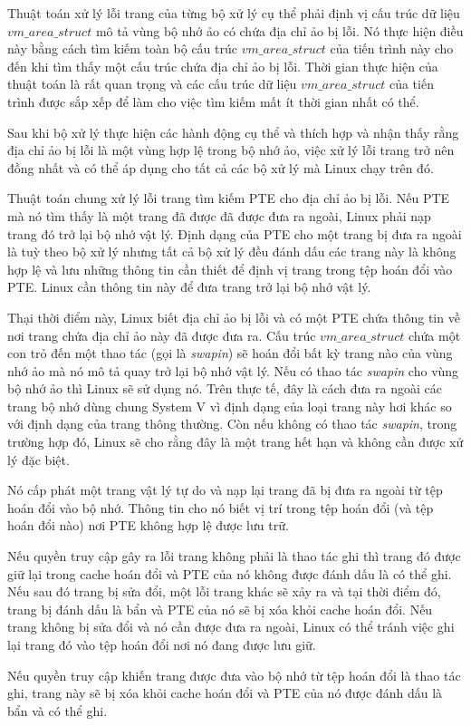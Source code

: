 \documentclass{article}
\begin{document}
Thuật toán xử lý lỗi trang của từng bộ xử lý cụ thể phải định vị cấu trúc dữ liệu $vm\_area\_struct$ mô tả vùng bộ nhớ ảo có chứa địa chỉ ảo bị lỗi. Nó thực hiện điều này bằng cách tìm kiếm toàn bộ cấu trúc $vm\_area\_struct$ của tiến trình này cho đến khi tìm thấy một cấu trúc chứa địa chỉ ảo bị lỗi. Thời gian thực hiện của thuật toán là rất quan trọng và các cấu trúc dữ liệu $vm\_area\_struct$ của tiến trình được sắp xếp để làm cho việc tìm kiếm mất ít thời gian nhất có thể.\vspace{1em}

Sau khi bộ xử lý thực hiện các hành động cụ thể và thích hợp và nhận thấy rằng địa chỉ ảo bị lỗi là một vùng hợp lệ trong bộ nhớ ảo, việc xử lý lỗi trang trở nên đồng nhất và có thể áp dụng cho tất cả các bộ xử lý mà Linux chạy trên đó.\vspace{1em}

Thuật toán chung xử lý lỗi trang tìm kiếm PTE cho địa chỉ ảo bị lỗi. Nếu PTE mà nó tìm thấy là một trang đã được đã được đưa ra ngoài, Linux phải nạp trang đó trở lại bộ nhớ vật lý. Định dạng của PTE cho một trang bị đưa ra ngoài là tuỳ theo bộ xử lý nhưng tất cả bộ xử lý đều đánh dấu các trang này là không hợp lệ và lưu những thông tin cần thiết để định vị trang trong tệp hoán đổi vào PTE. Linux cần thông tin này để đưa trang trở lại bộ nhớ vật lý.\vspace{1em}

Thại thời điểm này, Linux biết địa chỉ ảo bị lỗi và có một PTE chứa thông tin về nơi trang chứa địa chỉ ảo này đã được đưa ra. Cấu trúc $vm\_area\_struct$ chứa một con trỏ đến một thao tác (gọi là \textit{swapin}) sẽ hoán đổi bất kỳ trang nào của vùng nhớ ảo mà nó mô tả quay trở lại bộ nhớ vật lý. Nếu có thao tác \textit{swapin} cho vùng bộ nhớ ảo thì Linux sẽ sử dụng nó. Trên thực tế, đây là cách đưa ra ngoài các trang bộ nhớ dùng chung System V vì định dạng của loại trang này hơi khác so với định dạng của trang thông thường. Còn nếu không có thao tác \textit{swapin}, trong trường hợp đó, Linux sẽ cho rằng đây là một trang hết hạn và không cần được xử lý đặc biệt.\vspace{1em}

Nó cấp phát một trang vật lý tự do và nạp lại trang đã bị đưa ra ngoài từ tệp hoán đổi vào bộ nhớ. Thông tin cho nó biết vị trí trong tệp hoán đổi (và tệp hoán đổi nào) nơi PTE không hợp lệ được lưu trữ.\vspace{1em}

Nếu quyền truy cập gây ra lỗi trang không phải là thao tác ghi thì trang đó được giữ lại trong cache hoán đổi và PTE của nó không được đánh dấu là có thể ghi. Nếu sau đó trang bị sửa đổi, một lỗi trang khác sẽ xảy ra và tại thời điểm đó, trang bị đánh dấu là bẩn và PTE của nó sẽ bị xóa khỏi cache hoán đổi. Nếu trang không bị sửa đổi và nó cần được đưa ra ngoài, Linux có thể tránh việc ghi lại trang đó vào tệp hoán đổi nơi nó đang được lưu giữ.\vspace{1em}

Nếu quyền truy cập khiến trang được đưa vào bộ nhớ từ tệp hoán đổi là thao tác ghi, trang này sẽ bị xóa khỏi cache hoán đổi và PTE của nó được đánh dấu là bẩn và có thể ghi.
\end{document}
